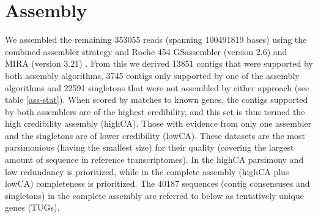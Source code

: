 \afterpage{\clearpage}

\section{Assembly}


We assembled the remaining 353055 reads (spanning 100491819 bases)
using the combined assembler strategy \cite{pmid20950480} and Roche
454 GSassembler (version 2.6) and MIRA (version 3.21)
\cite{miraEST}. From this we derived 13851 contigs that were supported
by both assembly algorithms, 3745 contigs only supported by one of the
assembly algorithms and 22591 singletons that were not assembled by
either approach (see table \ref{ass-stat}). When scored by matches to
known genes, the contigs supported by both assemblers are of the
highest credibility, and this set is thus termed the high credibility
assembly (highCA). Those with evidence from only one assembler and the
singletons are of lower credibility (lowCA). These datasets are the
most parsimonious (having the smallest size) for their quality
(covering the largest amount of sequence in reference
transcriptomes). In the highCA parsimony and low redundancy is
prioritized, while in the complete assembly (highCA plus lowCA)
completeness is prioritized. The 40187 sequences (contig consensuses
and singletons) in the complete assembly are referred to below as
tentatively unique genes (TUGs).

